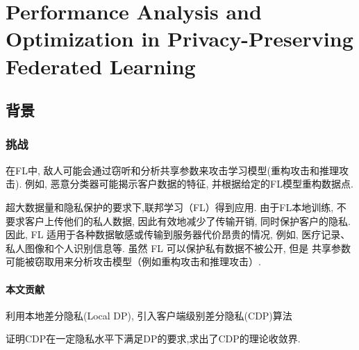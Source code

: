 \section{Performance Analysis and Optimization in Privacy-Preserving Federated Learning}


\subsection{背景}

\subsubsection{挑战}

在FL中, 敌人可能会通过窃听和分析共享参数来攻击学习模型(重构攻击和推理攻击). 
例如, 恶意分类器可能揭示客户数据的特征, 并根据给定的FL模型重构数据点.  

超大数据量和隐私保护的要求下,联邦学习（FL）得到应用. 由于FL本地训练, 不要求客户上传他们的私人数据, 因此有效地减少了传输开销, 同时保护客户的隐私. 
因此, FL 适用于各种数据敏感或传输到服务器代价昂贵的情况, 例如, 医疗记录、私人图像和个人识别信息等. 
虽然 FL 可以保护私有数据不被公开, 但是 共享参数可能被窃取用来分析攻击模型（例如重构攻击和推理攻击）. 

\paragraph{本文贡献}

利用本地差分隐私(Local DP), 引入客户端级别差分隐私(CDP)算法 

证明CDP在一定隐私水平下满足DP的要求,求出了CDP的理论收敛界.
 

